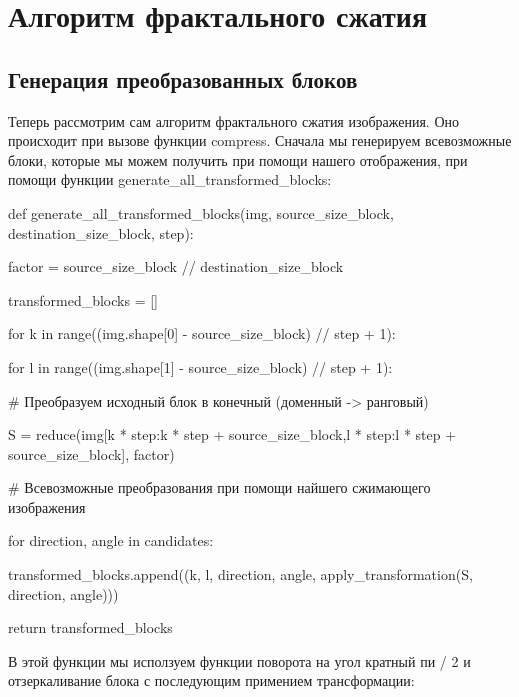 \documentclass{article}
\begin{document}
\section{Алгоритм фрактального сжатия}

\subsection{Генерация преобразованных блоков}

Теперь рассмотрим сам алгоритм фрактального сжатия изображения. Оно происходит при вызове функции compress. Сначала мы генерируем всевозможные блоки, которые мы можем получить при помощи нашего отображения, при помощи
функции generate\_all\_transformed\_blocks:
 
{
def generate\_all\_transformed\_blocks(img, source\_size\_block, destination\_size\_block, step):

\hspace{1cm}		factor = source\_size\_block // destination\_size\_block

\hspace{1cm}		transformed\_blocks = []

\hspace{1cm}		for k in range((img.shape[0] - source\_size\_block) // step + 1):

\hspace{2cm}			for l in range((img.shape[1] - source\_size\_block) // step + 1):

\hspace{3cm}				\# Преобразуем исходный блок в конечный (доменный -> ранговый)

\hspace{3cm}				S = reduce(img[k * step:k * step + source\_size\_block,l * step:l * step + source\_size\_block], factor)

\hspace{3cm}				\# Всевозможные преобразования при помощи найшего сжимающего изображения

\hspace{3cm}				for direction, angle in candidates:

\hspace{4cm}					transformed\_blocks.append((k, l, direction, angle, apply\_transformation(S, direction, angle)))

\hspace{1cm}		return transformed\_blocks
}
\vspace{1em}

В этой функции мы исползуем функции поворота на угол кратный пи / 2 и отзеркаливание блока с последующим примением трансформации:
\end{document}
